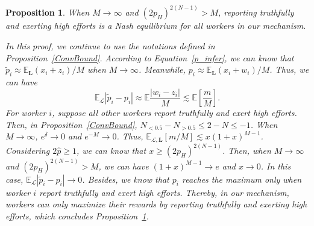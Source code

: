 \documentclass{article}
\makeatletter
\newtheorem{proposition}[theorem]{Proposition}
\renewenvironment{proof}[1][\proofname]{\par
  \vspace{-\topsep}%
  \pushQED{\qed}%
  \normalfont
  \topsep0pt \partopsep0pt %
  \trivlist
  \item[\hskip\labelsep
        \itshape
    #1\@addpunct{.}]\ignorespaces
}{%
  \popQED\endtrivlist\@endpefalse
  \addvspace{0pt plus 0pt} %
}
\makeatother
\begin{document}
\begin{proposition}
\label{OSEqulibrium}
When $M\rightarrow \infty$ and $(2p_H)^{2(N-1)}>M$,
reporting truthfully and exerting high efforts is a Nash equilibrium for all workers in our mechanism.
\begin{proof}
In this proof, we continue to use the notations defined in Proposition~\ref{ConvBound}.
According to Equation~\ref{p_infer}, we can know that $\tilde{p}_i\approx \mathbb{E}_{\bm{L}}(x_i+z_i)/M$ when $M\rightarrow \infty$.
Meanwhile, $p_i\approx \mathbb{E}_{\bm{L}}(x_i+w_i)/M$. Thus, we can have
\begin{equation}
\mathbb{E}_{\mathcal{L}}|\tilde{p}_i-p_i|\approx \mathbb{E}\frac{|w_i-z_i|}{M}\lesssim \mathbb{E}\left[\frac{m}{M}\right].
\end{equation}
For worker $i$, suppose all other workers report truthfully and exert high efforts. Then, in Proposition~\ref{ConvBound}, $N_{<0.5}-N_{>0.5}\leq 2-N\leq -1$.
When $M\rightarrow \infty$, $e^{\delta}\rightarrow 0$ and $e^{-M}\rightarrow 0$.
Thus, $\mathbb{E}_{\mathcal{L},\bm{L}}\left[m/M\right]\lesssim x(1+x)^{M-1}$. Considering $2\hat{p}\geq 1$, we can know that $x\geq (2p_H)^{2(N-1)}$. Then, when $M\rightarrow \infty$ and $(2p_H)^{2(N-1)}>M$, we can have $(1+x)^{M-1}\rightarrow e$ and $x\rightarrow 0$. In this case, $\mathbb{E}_{\mathcal{L}}|\tilde{p}_i-p_i|\rightarrow 0$.
Besides, we know that $p_i$ reaches the maximum only when worker $i$ report truthfully and exert high efforts.
Thereby, in our mechanism, workers can only maximize their rewards by reporting truthfully and exerting high efforts, which concludes Proposition~\ref{OSEqulibrium}.

\end{proof}
\end{proposition}
\end{document}
